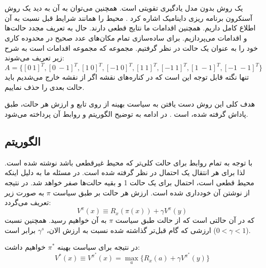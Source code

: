 \newpage
\section{}
یک روش بدون مدل یادگیری تقویتی است. همچنین می‌توان به آن به دید یک روش آسنکرون برنامه ریزی داینامیک اشاره کرد \cite{watkins1992q}. محیط را همانند شرایط قبل نسبت به آن اطلاع کامل داریم. همچنین اقدامات ما نتایج قطعی دارند. حال به تعریف مجدد حالت‌ها و اقدامات می‌پردازیم. برای ساده‌سازی تمام مکان‌های عدد صحیح در محدوده کاری خود را به عنوان یک حالت در نظر گرفتیم. مجموعه  که مجموعه اقدامات است به شرح زیر تعریف می‌شوند:
\begin{equation}
	A = \{[0~1]^T, [0~-1]^T, [1~0]^T, [-1~0]^T, [1~1]^T, [-1~1]^T, [1~-1]^T, [-1~-1]^T\}
\end{equation}
تنها نگته قابل توجه این است که در کناره‌های نقشه اگر از نقشه خارج می‌شدیم باید حالت بعدی را حذف نماییم. 

هدف کلی این روش دست یافتن به سیاست بهینه از روی تابع  و ارزش هر حالت،  طبق پاداش گرفته شده، است \cite{sutton1998introduction}. در ادامه به توضیح الگوریتم و روابط آن پرداخته می‌شود.

\subsection{الگوریتم }
با توجه به \cite{watkins1992q} تمام روابط برای حالت کلی‌تر که محیط غیرقطعی باشد نوشته شده است. لذا برای هر انتقال یک احتمال در نظر گرفته شده است. در مسئله ما به دلیل اینکه محیط قطعی است، احتمال برای یک حالت 1 و بقیه حالت‌ها صفر خواهد شد. در نتیجه از نوشتن آن خودداری شده است. ارزش هر حالت بر طبق سیاست $\pi$ به صورت زیر تعریف می‌گردد:
\begin{equation}
	V^\pi (x) \equiv R_x(\pi(x)) + \gamma V^\pi (y)
\end{equation}
که در آن  حالتی است که از حالت  طبق سیاست $\pi$ به آن خواهیم رسید. همچنین نسبت ارزشی که  گام قبل‌تر گذاشته شده نسبت به ارزش الان، $\gamma^s$ برابر است 
($0 < \gamma < 1$).

در نتیجه برای سیاست بهینه $\pi^*$ خواهیم داشت:
\begin{equation}
	V^*(x) \equiv V^{\pi^*} (x) = \max_{a}\{R_x(a) + \gamma V^{\pi^*} (y)\}
\end{equation}

